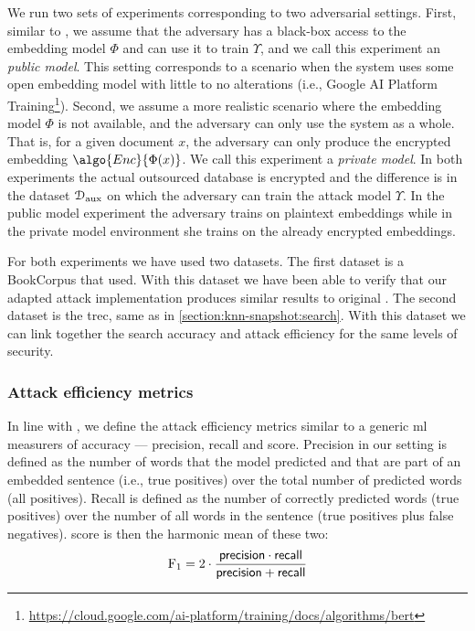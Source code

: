 			We run two sets of experiments corresponding to two adversarial settings.
			First, similar to \cite{embedding-attacks}, we assume that the adversary has a black-box access to the embedding model $\Phi$ and can use it to train $\Upsilon$, and we call this experiment an \emph{public model}.
			This setting corresponds to a scenario when the system uses some open embedding model with little to no alterations (i.e., Google AI Platform Training\footnote{
				\url{https://cloud.google.com/ai-platform/training/docs/algorithms/bert}
			}).
			Second, we assume a more realistic scenario where the embedding model $\Phi$ is not available, and the adversary can only use the system as a whole.
			That is, for a given document $x$, the adversary can only produce the encrypted embedding $\algo{Enc}{\Phi(x)}$.
			We call this experiment a \emph{private model}.
			In both experiments the actual outsourced database is encrypted and the difference is in the dataset $\mathcal{D}_\text{aux}$ on which the adversary can train the attack model $\Upsilon$.
			In the public model experiment the adversary trains on plaintext embeddings while in the private model environment she trains on the already encrypted embeddings.

			For both experiments we have used two datasets.
			The first dataset is a BookCorpus \cite{bookcorpus} that \textcite{embedding-attacks} used.
			With this dataset we have been able to verify that our adapted attack implementation produces similar results to original \cite{embedding-attacks}.
			The second dataset is the \acrshort{trec}, same as in \cref{section:knn-snapshot:search}.
			With this dataset we can link together the search accuracy and attack efficiency for the same levels of security.

			\subsubsection{Attack efficiency metrics}

				In line with \cite{embedding-attacks}, we define the attack efficiency metrics similar to a generic \acrshort{ml} measurers of accuracy --- precision, recall and \FOne{} score.
				Precision in our setting is defined as the number of words that the model predicted and that are part of an embedded sentence (i.e., true positives) over the total number of predicted words (all positives).
				Recall is defined as the number of correctly predicted words (true positives) over the number of all words in the sentence (true positives plus false negatives).
				\FOne{} score is then the harmonic mean of these two:
				\[
					\text{F}_1 = 2 \cdot \frac{ \mathsf{precision} \cdot \mathsf{recall} }{ \mathsf{precision} + \mathsf{recall} }
				\]

